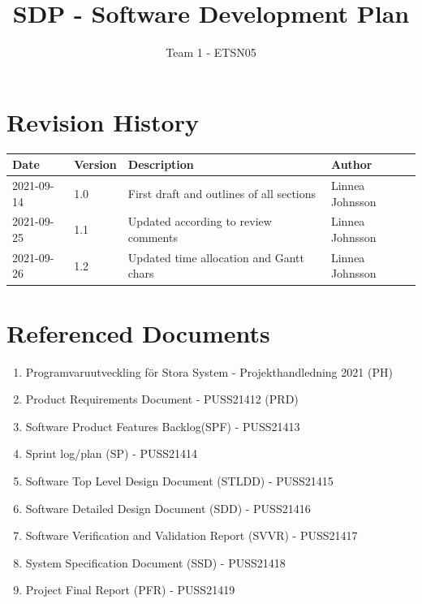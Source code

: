 \documentclass{article}
\title{SDP - Software Development Plan}
\author{Team 1 - ETSN05}
\begin{document}
\date{}
\maketitle
\thispagestyle{fancy}
\newpage

\section*{Revision History}
\begin{table}[h]
    \centering
    \begin{tabular}{|l|l|p{55mm}|l|}
    \hline
    Date & Version & Description & Author \\ 
    \hline\hline 
    2021-09-14 & 1.0 & First draft and outlines of all sections & Linnea Johnsson \\
    \hline
    2021-09-25 & 1.1 & Updated according to review comments & Linnea Johnsson \\ 
    \hline
    2021-09-26 & 1.2 & Updated time allocation and Gantt chars & Linnea Johnsson  \\ 
    \hline
    \end{tabular}
    \label{tab:history}
\end{table}
\newpage
 
\section*{Referenced Documents}\label{refdoc}
\begin{enumerate}
    \item Programvaruutveckling för Stora System - Projekthandledning 2021 (PH)
    \item Product Requirements Document - PUSS21412 (PRD)
    \item Software Product Features Backlog(SPF) - PUSS21413
    \item Sprint log/plan (SP) - PUSS21414
    \item Software Top Level Design Document (STLDD) - PUSS21415
    \item Software Detailed Design Document (SDD) - PUSS21416
    \item Software Verification and Validation Report (SVVR) - PUSS21417
    \item System Specification Document (SSD) - PUSS21418
    \item Project Final Report (PFR) - PUSS21419

\end{enumerate}
\newpage
\end{document}
